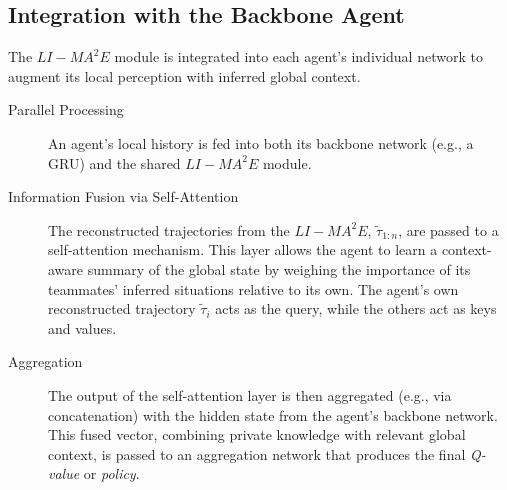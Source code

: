 \subsection{Integration with the Backbone Agent}
The $LI-{MA}^2E$ module is integrated into each agent's individual network to augment its local perception with inferred global context.
\begin{description}
    \item[Parallel Processing] An agent's local history is fed into both its backbone network (e.g., a GRU) and the shared $LI-{MA}^2E$ module.
    \item[Information Fusion via Self-Attention] The reconstructed trajectories from the $LI-{MA}^2E$, $\tilde{\tau}_{1:n}$, are passed to a self-attention mechanism. This layer allows the agent to learn a context-aware summary of the global state by weighing the importance of its teammates' inferred situations relative to its own. The agent's own reconstructed trajectory $\tilde{\tau}_i$ acts as the query, while the others act as keys and values.
    \item[Aggregation] The output of the self-attention layer is then aggregated (e.g., via concatenation) with the hidden state from the agent's backbone network. This fused vector, combining private knowledge with relevant global context, is passed to an aggregation network that produces the final \textit{Q-value} or \textit{policy}.
\end{description}

